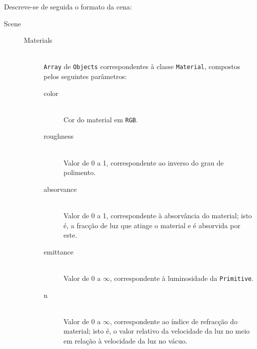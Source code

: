 \documentclass[a4paper]{article}
\begin{document}
\indent Descreve-se de seguida o formato da cena:
\begin{description}
	\item[Scene] \hfill
		\begin{description}
			\item[Materials] \hfill \\
				\texttt{Array} de \texttt{Objects} correspondentes à classe \texttt{Material}, compostos pelos seguintes parâmetros:
				\begin{description}
					\item[color] \hfill \\
						Cor do material em \texttt{RGB}.
					\item[roughness] \hfill \\
						Valor de 0 a 1, correspondente ao inverso do grau de polimento.
					\item[absorvance] \hfill \\
						Valor de 0 a 1, correspondente à absorvância do material; isto é, a fracção de luz que atinge o material e é absorvida por este.
					\item[emittance] \hfill \\
						Valor de 0 a $\infty$, correspondente à luminosidade da \texttt{Primitive}.
					\item[n] \hfill \\
						Valor de 0 a $\infty$, correspondente ao índice de refracção do material; isto é, o valor relativo da velocidade da luz no meio em relação
						à velocidade da luz no vácuo.
				\end{description}


\end{description}
\end{description}
\end{document}
